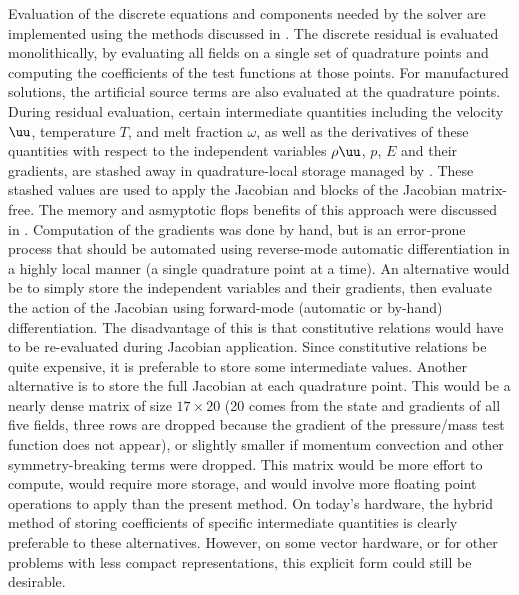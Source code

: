 Evaluation of the discrete equations and components needed by the solver are implemented using the methods discussed in .
The discrete residual is evaluated monolithically, by evaluating all fields on a single set of quadrature points and computing the coefficients of the test functions at those points.
For manufactured solutions, the artificial source terms are also evaluated at the quadrature points.
During residual evaluation, certain intermediate quantities including the velocity $\uu$, temperature $T$, and melt fraction $\omega$, as well as the derivatives of these quantities with respect to the independent variables $\rho\uu$, $p$, $E$ and their gradients, are stashed away in quadrature-local storage managed by {\Dohp}.
These stashed values are used to apply the Jacobian and blocks of the Jacobian matrix-free.
The memory and asmyptotic flops benefits of this approach were discussed in .
Computation of the gradients was done by hand, but is an error-prone process that should be automated using reverse-mode automatic differentiation in a highly local manner (a single quadrature point at a time).
An alternative would be to simply store the independent variables and their gradients, then evaluate the action of the Jacobian using forward-mode (automatic or by-hand) differentiation.
The disadvantage of this is that constitutive relations would have to be re-evaluated during Jacobian application.
Since constitutive relations be quite expensive, it is preferable to store some intermediate values.
Another alternative is to store the full Jacobian at each quadrature point.
This would be a nearly dense matrix of size $17\times 20$ (20 comes from the state and gradients of all five fields, three rows are dropped because the gradient of the pressure/mass test function does not appear), or slightly smaller if momentum convection and other symmetry-breaking terms were dropped.
This matrix would be more effort to compute, would require more storage, and would involve more floating point operations to apply than the present method.
On today's hardware, the hybrid method of storing coefficients of specific intermediate quantities is clearly preferable to these alternatives.
However, on some vector hardware, or for other problems with less compact representations, this explicit form could still be desirable.

